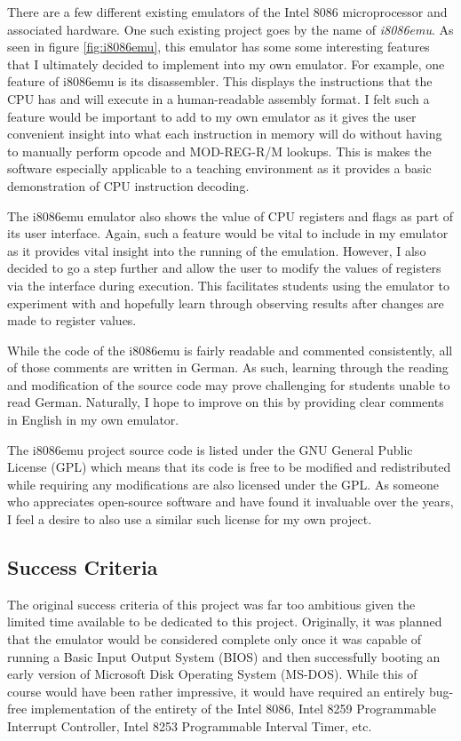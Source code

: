         There are a few different existing emulators of the Intel 8086 microprocessor and associated hardware. One such existing project goes by the name of \textit{i8086emu}. As seen in figure \ref{fig:i8086emu}, this emulator has some some interesting features that I ultimately decided to implement into my own emulator. For example, one feature of i8086emu is its disassembler. This displays the instructions that the CPU has and will execute in a human-readable assembly format. I felt such a feature would be important to add to my own emulator as it gives the user convenient insight into what each instruction in memory will do without having to manually perform opcode and MOD-REG-R/M lookups. This is makes the software especially applicable to a teaching environment as it provides a basic demonstration of CPU instruction decoding.

        The i8086emu emulator also shows the value of CPU registers and flags as part of its user interface. Again, such a feature would be vital to include in my emulator as it provides vital insight into the running of the emulation. However, I also decided to go a step further and allow the user to modify the values of registers via the interface during execution. This facilitates students using the emulator to experiment with and hopefully learn through observing results after changes are made to register values.

        While the code of the i8086emu is fairly readable and commented consistently, all of those comments are written in German. As such, learning through the reading and modification of the source code may prove challenging for students unable to read German. Naturally, I hope to improve on this by providing clear comments in English in my own emulator.

        The i8086emu project source code is listed under the GNU General Public License (GPL) which means that its code is free to be modified and redistributed while requiring any modifications are also licensed under the GPL. As someone who appreciates open-source software and have found it invaluable over the years, I feel a desire to also use a similar such license for my own project.

\subsection{Success Criteria}
    The original success criteria of this project was far too ambitious given the limited time available to be dedicated to this project. Originally, it was planned that the emulator would be considered complete only once it was capable of running a Basic Input Output System (BIOS) and then successfully booting an early version of Microsoft Disk Operating System (MS-DOS). While this of course would have been rather impressive, it would have required an entirely bug-free implementation of the entirety of the Intel 8086, Intel 8259 Programmable Interrupt Controller, Intel 8253 Programmable Interval Timer, etc.

